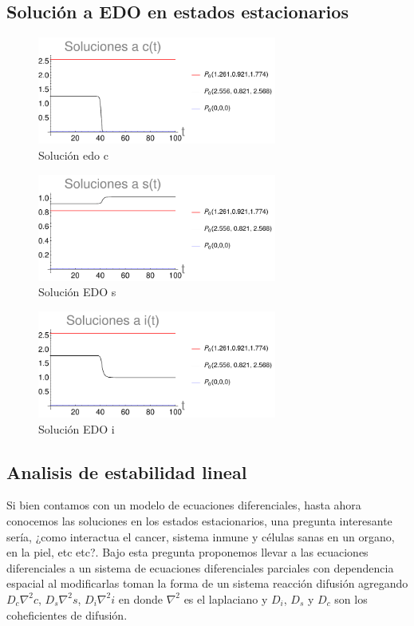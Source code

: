 \documentclass{article}
\begin{document}
\newpage

\subsection{Solución a EDO en estados estacionarios}


\begin{figure}[ht]
    \centering
    \includegraphics[width=0.7\textwidth]{images/solucion_c.pdf}
    \caption{Solución edo c}
    \label{fig:sol_edo_c}
\end{figure}


\begin{figure}[ht]
    \centering
    \includegraphics[width=0.7\textwidth]{images/solucion_s.pdf}
    \caption{Solución EDO s}
    \label{fig:sol_edo_s}
\end{figure}


\begin{figure}[ht]
    \centering
    \includegraphics[width=0.7\textwidth]{images/solucion_i.pdf}
    \caption{Solución EDO i}
    \label{fig:sol_edo_i}
\end{figure}


\newpage
\subsection{Analisis de estabilidad lineal}
Si bien contamos con un modelo de ecuaciones diferenciales, hasta ahora conocemos las soluciones en los estados estacionarios, una pregunta interesante sería, ¿como interactua el cancer, sistema inmune y células sanas en un organo, en la piel, etc etc?. Bajo esta pregunta proponemos llevar a las ecuaciones diferenciales a un sistema de ecuaciones diferenciales parciales con dependencia espacial al modificarlas toman la forma de un sistema reacción difusión agregando $D_c \nabla ^2 c$, $D_s \nabla ^2 s$, $D_i \nabla ^2 i$ en donde $\nabla ^2$ es el laplaciano y $D_i$, $D_s$ y $D_c$ son los coheficientes de difusión.
\end{document}
